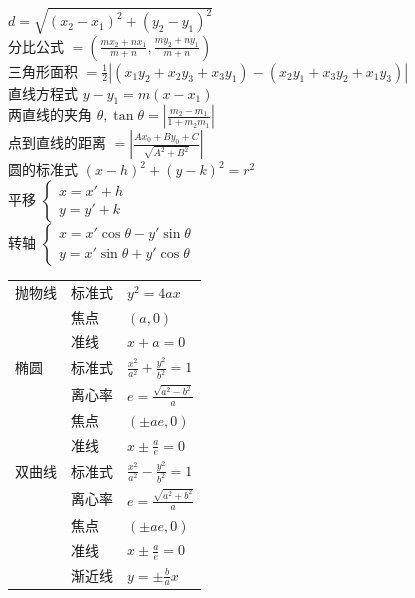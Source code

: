 $d = \sqrt{(x_{2}-x_{1})^{2} + (y_{2}-y_{1})^{2}}$ \\[12pt]
分比公式 $= \left( \frac{mx_{2}+nx_{1}}{m+n}, \frac{my_{2}+ny_{1}}{m+n} \right)$ \\[12pt]
三角形面积 $= \frac{1}{2} |(x_{1}y_{2} + x_{2}y_{3} + x_{3}y_{1}) - (x_{2}y_{1} + x_{3}y_{2} + x_{1}y_{3})|$ \\[12pt]
直线方程式 \quad $y - y_{1} = m(x - x_{1})$ \\[12pt]
两直线的夹角 $\theta, \tan \theta = \left| \frac{m_{2}-m_{1}}{1+m_{2}m_{1}} \right|$ \\[12pt]
点到直线的距离 $= \left| \frac{Ax_{0} + By_{0} + C}{\sqrt{A^{2}+B^{2}}} \right|$ \\[12pt]
圆的标准式 \quad $(x-h)^{2} + (y-k)^{2} = r^{2}$ \\[12pt]
平移 \quad $\begin{cases} x = x' + h \\ y = y' + k \end{cases}$ \\[12pt]
转轴 \quad $\begin{cases} x = x' \cos\theta - y' \sin\theta \\ y = x' \sin\theta + y' \cos\theta \end{cases}$ \\[15pt]

\begin{tabular}{lll}
抛物线 & 标准式 & $y^{2} = 4ax$ \\
       & 焦点   & $(a, 0)$ \\
       & 准线   & $x + a = 0$ \\[10pt]
椭圆   & 标准式 & $\frac{x^{2}}{a^{2}} + \frac{y^{2}}{b^{2}} = 1$ \\
       & 离心率 & $e = \frac{\sqrt{a^{2}-b^{2}}}{a}$ \\
       & 焦点   & $(\pm ae, 0)$ \\
       & 准线   & $x \pm \frac{a}{e} = 0$ \\[10pt]
双曲线 & 标准式 & $\frac{x^{2}}{a^{2}} - \frac{y^{2}}{b^{2}} = 1$ \\
       & 离心率 & $e = \frac{\sqrt{a^{2}+b^{2}}}{a}$ \\
       & 焦点   & $(\pm ae, 0)$ \\
       & 准线   & $x \pm \frac{a}{e} = 0$ \\
       & 渐近线 & $y = \pm \frac{b}{a}x$
\end{tabular}

\newpage

